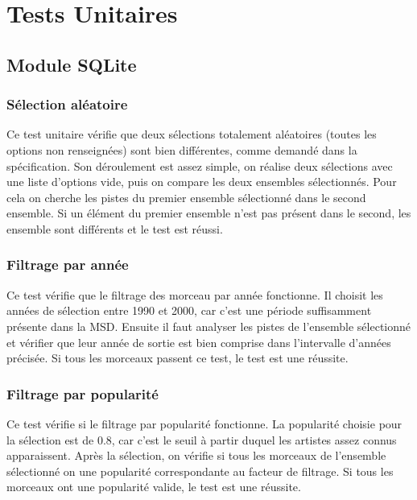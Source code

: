 \section{Tests Unitaires}
\label{tests:unitaires}

\subsection{Module SQLite}
\label{tests:unitaires:sqlite}

\subsubsection{Sélection aléatoire}
\label{tests:unitaires:sqlite:random}

Ce test unitaire vérifie que deux sélections totalement aléatoires (toutes les
options non renseignées) sont bien différentes, comme demandé dans la
spécification. Son déroulement est assez simple, on réalise deux sélections avec
une liste d'options vide, puis on compare les deux ensembles sélectionnés.
Pour cela on cherche les pistes du premier ensemble sélectionné dans le second
ensemble. Si un élément du premier ensemble n'est pas présent dans le second,
les ensemble sont différents et le test est réussi.

\subsubsection{Filtrage par année}
\label{tests:unitaires:sqlite:annee}

Ce test vérifie que le filtrage des morceau par année fonctionne. Il choisit les
années de sélection entre 1990 et 2000, car c'est une période suffisamment
présente dans la MSD. Ensuite il faut analyser les pistes de l'ensemble
sélectionné et vérifier que leur année de sortie est bien comprise dans
l'intervalle d'années précisée. Si tous les morceaux passent ce test, le test
est une réussite.

\subsubsection{Filtrage par popularité}
\label{tests:unitaires:sqlite:popularite}

Ce test vérifie si le filtrage par popularité fonctionne. La popularité choisie 
pour la sélection est de 0.8, car c'est le seuil à partir duquel les artistes
assez connus apparaissent. Après la sélection, on vérifie si tous les morceaux
de l'ensemble sélectionné on une popularité correspondante au facteur de
filtrage. Si tous les morceaux ont une popularité valide, le test est une
réussite.


